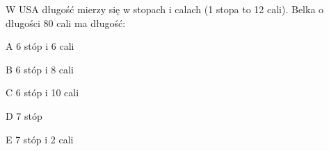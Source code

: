 \begin{tresc}
W USA długość mierzy się w stopach i calach (1 stopa to 12 cali). Belka o długości 80 cali ma długość:
\end{tresc}
\begin{wariant}{A} 6 stóp i 6 cali \end{wariant}
\begin{wariant}{B} 6 stóp i 8 cali \end{wariant}
\begin{wariant}{C} 6 stóp i 10 cali \end{wariant}
\begin{wariant}{D} 7 stóp \end{wariant}
\begin{wariant}{E} 7 stóp i 2 cali \end{wariant}
